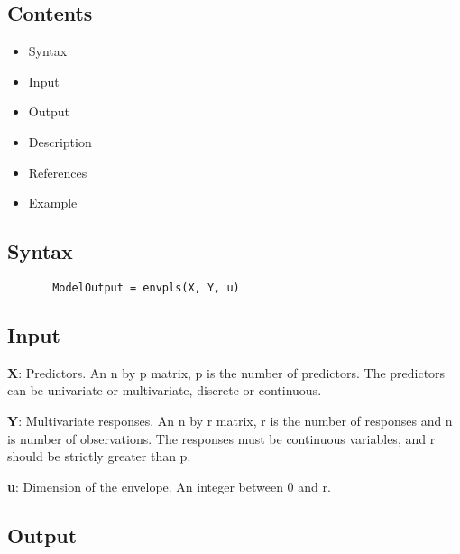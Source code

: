 \documentclass[a4paper,11pt,openany]{memoir}
\begin{document}
\subsection*{Contents}

\begin{itemize}
\setlength{\itemsep}{-1ex}
   \item Syntax
   \item Input
   \item Output
   \item Description
   \item References
   \item Example
\end{itemize}


\subsection*{Syntax}


\begin{verbatim}       ModelOutput = envpls(X, Y, u)\end{verbatim}
    

\subsection*{Input}

\begin{par}
\textbf{X}: Predictors. An n by p matrix, p is the number of predictors. The predictors can be univariate or multivariate, discrete or continuous.
\end{par} \vspace{1em}
\begin{par}
\textbf{Y}: Multivariate responses. An n by r matrix, r is the number of responses and n is number of observations. The responses must be continuous variables, and r should be strictly greater than p.
\end{par} \vspace{1em}
\begin{par}
\textbf{u}: Dimension of the envelope. An integer between 0 and r.
\end{par} \vspace{1em}


\subsection*{Output}
\end{document}
